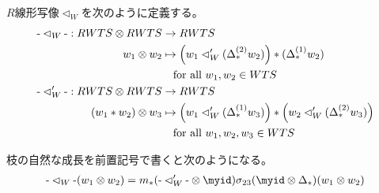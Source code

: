 	\begin{definition}[枝の自然な成長]\label{def:枝の自然な成長} %
		$R$線形写像$\lhd_W$を次のように定義する。
		\begin{equation}\begin{split} %
			\mathchar`-\lhd_W\mathchar`-: RWTS\otimes RWTS &\to RWTS \\
				w_1\otimes w_2 &\mapsto \left(w_1\lhd_W' (\Delta_*^{(2)}w_2)\right)*(\Delta_*^{(1)}w_2) \\
				&\quad\text{for all }w_1,w_2\in WTS \\
			\mathchar`-\lhd_W'\mathchar`-: RWTS\otimes RWTS &\to RWTS \\
				(w_1*w_2)\otimes w_3 &\mapsto \left(w_1\lhd_W' (\Delta_*^{(1)}w_3)\right)*\left(w_2\lhd_W' (\Delta_*^{(2)}w_3)\right) \\
				&\quad\text{for all }w_1,w_2,w_3\in WTS \\
		\end{split}\end{equation} %
	\end{definition} %

	枝の自然な成長を前置記号で書くと次のようになる。
	\begin{equation*}\begin{split} %
		\mathchar`-\lhd_W\mathchar`-(w_1\otimes w_2)
		&= m_*(\mathchar`-\lhd_W'\mathchar`-\otimes \myid)\sigma_{23}(\myid\otimes \Delta_*)(w_1\otimes w_2) \\
	\end{split}\end{equation*} %

